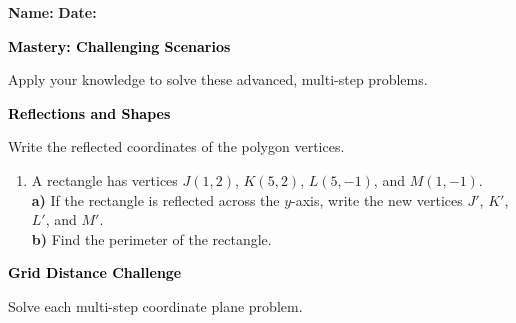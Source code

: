 \documentclass[12pt, letterpaper, fleqn]{article}
\newcommand{\blanklong}{\underline{\hspace{6.5cm}}}
\begin{document}
\textbf{Name:} \underline{\hspace{5cm}}
\hfill
\textbf{Date:} \underline{\hspace{3cm}}\\

\begin{tcolorbox}[colback=customteal!20]
    \large\textcolor{black}{\textbf{Mastery: Challenging Scenarios}}
\end{tcolorbox}

\vspace{3mm}
\noindent
Apply your knowledge to solve these advanced, multi-step problems.

\vspace{4mm}

\begin{tcolorbox}[colback=customteal!20]
\large\textcolor{black}{\textbf{Reflections and Shapes}}
\end{tcolorbox}

\noindent
Write the reflected coordinates of the polygon vertices.

\vspace{3mm}
\begin{enumerate}[itemsep=1.5cm, leftmargin=0.6cm]
\item A rectangle has vertices $J(1, 2)$, $K(5, 2)$, $L(5, -1)$, and $M(1, -1)$. \\
\textbf{a)} If the rectangle is reflected across the $y$-axis, write the new vertices $J'$, $K'$, $L'$, and $M'$. \blanklong \\
\textbf{b)} Find the perimeter of the rectangle. \blanklong
\vspace{1.5cm}
\end{enumerate}
\newpage

\begin{tcolorbox}[colback=customteal!20]
\large\textcolor{black}{\textbf{Grid Distance Challenge}}
\end{tcolorbox}

\noindent
Solve each multi-step coordinate plane problem.
\end{document}
